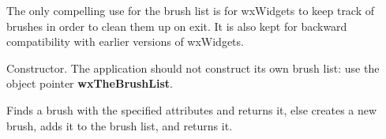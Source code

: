 The only compelling use for the brush list is for wxWidgets to keep
track of brushes in order to clean them up on exit. It is also kept for
backward compatibility with earlier versions of wxWidgets.





\label{wxbrushlistconstr}


Constructor. The application should not construct its own brush list:
use the object pointer {\bf wxTheBrushList}.


\label{wxbrushlistfindorcreatebrush}


Finds a brush with the specified attributes and returns it, else creates a new brush, adds it
to the brush list, and returns it.





